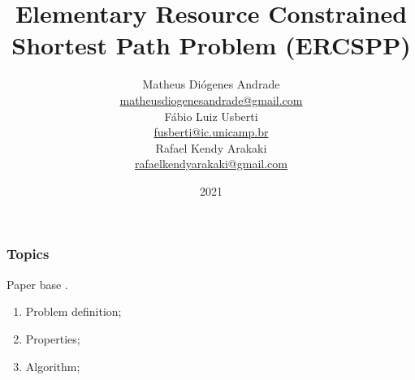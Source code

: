 \documentclass[notheorems]{beamer}
\title{Elementary Resource Constrained Shortest Path Problem (ERCSPP)}
\author{Matheus Diógenes Andrade\\
\href{mailto:matheusdiogenesandrade@gmail.com}{matheusdiogenesandrade@gmail.com}\\
Fábio Luiz Usberti\\
\href{mailto:fusberti@ic.unicamp.br}{fusberti@ic.unicamp.br}\\
Rafael Kendy Arakaki\\
\href{mailto:rafaelkendyarakaki@gmail.com}{rafaelkendyarakaki@gmail.com}
}
\institute{Institute of Computing - University of Campinas}
\date{2021}
\theoremstyle{definition}
\theoremstyle{example}
\theoremstyle{plain}
\begin{document}
\frame{\titlepage}

\begin{frame}
  \frametitle{Topics}
  Paper base .
  \begin{enumerate}
    \item Problem definition;
    \item Properties;
    \item Algorithm;
  \end{enumerate}
\end{frame}







\begin{frame}
\printbibliography
\end{frame}
\end{document}
